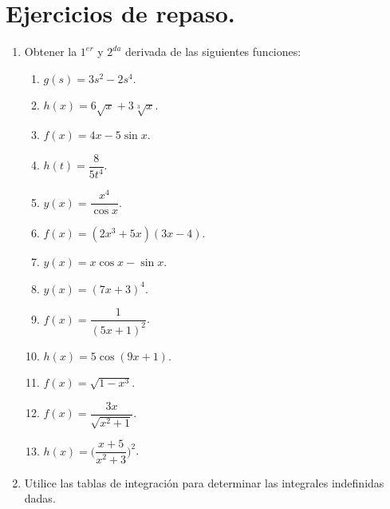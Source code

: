 \documentclass[letterpaper,10pt]{memoir}
\begin{document}
\titulo

\section{Ejercicios de repaso.} %
\begin{enumerate}
	\item Obtener la \(1^{er}\) y \(2^{da}\) derivada de las siguientes funciones:\\[3mm]
		\begin{minipage}{0.3\linewidth}
			\begin{enumerate}
				\item \(g(s) = 3s^2-2s^4\).
				\item \(h(x) = 6 \sqrt{x} +3 \sqrt[3]{x}\).
				\item \(f(x) = 4x-5 \sin x\).
				\item \(h(t) = \dfrac{8}{5t^4}\).
				\item \(y(x) = \dfrac{x^4}{\cos x}\).
			\end{enumerate}
		\end{minipage}\hspace{5mm}
		\begin{minipage}{0.3\linewidth}
			\begin{enumerate}
				\setcounter{enumii}{5}
			\item \(f(x) = (2x^3+5x) (3x-4)\).
			\item \(y(x) = x \cos x- \sin x\).
			\item \(y(x)=(7x +3) ^4\).
			\item \(f(x) = \dfrac{1}{(5x+1) ^2}\).
			\item \(h(x) = 5 \cos (9x+1)\).
			\end{enumerate}
		\end{minipage}
		\begin{minipage}{0.3\linewidth}
			\begin{enumerate}
				\setcounter{enumii}{10}
				\item \(f(x) = \sqrt{1-x^3}\).
				\item \(f(x) = \dfrac{3x}{\sqrt{x^2+1}}\).
				\item \(h(x) = \bigg(\dfrac{x+5}{x^2+3}\bigg) ^2\).
			\end{enumerate}
		\end{minipage} 
	\item Utilice las tablas de integración para determinar las integrales indefinidas dadas.\\[2mm]
		\begin{minipage}{0.3\linewidth}

\end{minipage}
\end{enumerate}
\end{document}

